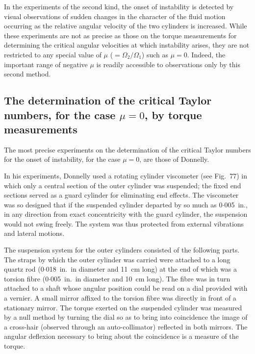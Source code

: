 In the experiments of the second kind, the onset of instability is
detected by visual observations of sudden changes in the character of the
fluid motion occurring as the relative angular velocity of the two
cylinders is increased.  While these experiments are not as precise as
those on the torque measurements for determining the critical angular
velocities at which instability arises, they are not restricted to any special
value of $\mu$ ($= \Omega_2/\Omega_1$) such as $\mu = 0$.  Indeed, the important range of
negative $\mu$ is readily accessible to observations only by this second
method.

\subsection{The determination of the critical Taylor numbers, for the case $\mu = 0$,
by torque measurements}\label{sec:7-74a}

The most precise experiments on the determination of the critical
Taylor numbers for the onset of instability, for the case $\mu = 0$, are those
of Donnelly.

In his experiments, Donnelly used a rotating cylinder viscometer (see
Fig.~77) in which only a central section of the outer cylinder was sus\-pended;
the fixed end sections served as a guard cylinder for eliminating
end effects.  The viscometer was so designed that if the suspended
cylinder departed by so much as 0$\cdot$005~in., in any direction from exact
concentricity with the guard cylinder, the suspension would not swing
freely.  The system was thus protected from external vibrations and
lateral motions.


The suspension system for the outer cylinders consisted of the follow\-ing
parts.  The straps by which the outer cylinder was carried were
attached to a long quartz rod (0$\cdot$018~in.\ in diameter and 11~cm long) at
the end of which was a torsion fibre (0$\cdot$005~in.\ in diameter and 10~cm long).
The fibre was in turn attached to a shaft whose angular position could be
read on a dial provided with a vernier.  A small mirror affixed to the
torsion fibre was directly in front of a stationary mirror.  The torque
exerted on the suspended cylinder was measured by a null method by
turning the dial so as to bring into coincidence the image of a cross-hair
(observed through an auto-collimator) reflected in both mirrors.  The
angular deflexion necessary to bring about the coincidence is a measure
of the torque.

